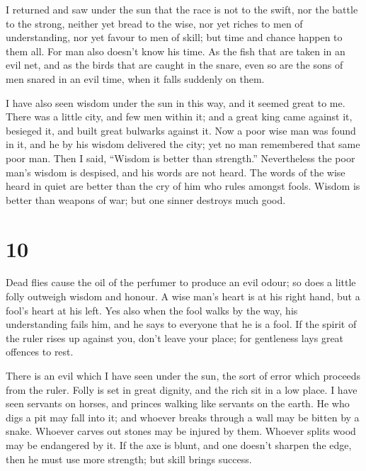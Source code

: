  I returned and saw under the sun that the race is not to
the swift, nor the battle to the strong, neither yet bread to the wise,
nor yet riches to men of understanding, nor yet favour to men of skill;
but time and chance happen to them all.  For man also
doesn't know his time. As the fish that are taken in an evil net, and as
the birds that are caught in the snare, even so are the sons of men
snared in an evil time, when it falls suddenly on them.

 I have also seen wisdom under the sun in this way, and it
seemed great to me.  There was a little city, and few men
within it; and a great king came against it, besieged it, and built
great bulwarks against it.  Now a poor wise man was found
in it, and he by his wisdom delivered the city; yet no man remembered
that same poor man.  Then I said, ``Wisdom is better than
strength.'' Nevertheless the poor man's wisdom is despised, and his
words are not heard.  The words of the wise heard in quiet
are better than the cry of him who rules amongst fools. 
Wisdom is better than weapons of war; but one sinner destroys much good.

\hypertarget{section-9}{%
\section{10}\label{section-9}}

 Dead flies cause the oil of the perfumer to produce an evil
odour; so does a little folly outweigh wisdom and honour.  A
wise man's heart is at his right hand, but a fool's heart at his left.
 Yes also when the fool walks by the way, his understanding
fails him, and he says to everyone that he is a fool.  If
the spirit of the ruler rises up against you, don't leave your place;
for gentleness lays great offences to rest.

 There is an evil which I have seen under the sun, the sort
of error which proceeds from the ruler.  Folly is set in
great dignity, and the rich sit in a low place.  I have seen
servants on horses, and princes walking like servants on the earth.
 He who digs a pit may fall into it; and whoever breaks
through a wall may be bitten by a snake.  Whoever carves out
stones may be injured by them. Whoever splits wood may be endangered by
it.  If the axe is blunt, and one doesn't sharpen the edge,
then he must use more strength; but skill brings success.

